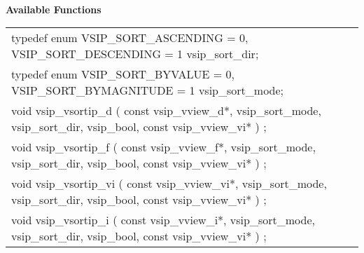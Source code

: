 \\\cvsiplh
\newline \hspace*{.8cm} \vspace*{.1cm} \textbf{Available Functions }
\newline \hspace*{1.1cm} {
\ttfamily
\begin{tabular}[H]{l}
typedef enum { VSIP\_SORT\_ASCENDING = 0, VSIP\_SORT\_DESCENDING = 1 } vsip\_sort\_dir;\\
typedef enum { VSIP\_SORT\_BYVALUE = 0, VSIP\_SORT\_BYMAGNITUDE = 1 } vsip\_sort\_mode;\\
void vsip\_vsortip\_d ( const vsip\_vview\_d*, vsip\_sort\_mode, vsip\_sort\_dir, vsip\_bool, const vsip\_vview\_vi* ) ;\\
void vsip\_vsortip\_f ( const vsip\_vview\_f*, vsip\_sort\_mode, vsip\_sort\_dir, vsip\_bool, const vsip\_vview\_vi* ) ;\\
void vsip\_vsortip\_vi ( const vsip\_vview\_vi*, vsip\_sort\_mode, vsip\_sort\_dir, vsip\_bool, const vsip\_vview\_vi* ) ;\\
void vsip\_vsortip\_i ( const vsip\_vview\_i*, vsip\_sort\_mode, vsip\_sort\_dir, vsip\_bool, const vsip\_vview\_vi* ) ;\\
\end{tabular}
}\\
\\\pyjvsiph
{}
